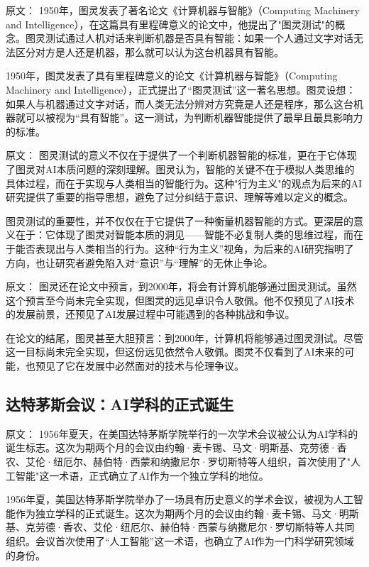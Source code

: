 原文：
1950年，图灵发表了著名论文《计算机器与智能》（Computing Machinery and Intelligence），在这篇具有里程碑意义的论文中，他提出了"图灵测试"的概念。图灵测试通过人机对话来判断机器是否具有智能：如果一个人通过文字对话无法区分对方是人还是机器，那么就可以认为这台机器具有智能。

1950年，图灵发表了具有里程碑意义的论文《计算机器与智能》（Computing Machinery and Intelligence），正式提出了“图灵测试”这一著名思想。图灵设想：如果人与机器通过文字对话，而人类无法分辨对方究竟是人还是程序，那么这台机器就可以被视为“具有智能”。这一测试，为判断机器智能提供了最早且最具影响力的标准。

原文：
图灵测试的意义不仅在于提供了一个判断机器智能的标准，更在于它体现了图灵对AI本质问题的深刻理解。图灵认为，智能的关键不在于模拟人类思维的具体过程，而在于实现与人类相当的智能行为。这种"行为主义"的观点为后来的AI研究提供了重要的指导思想，避免了过分纠结于意识、理解等难以定义的概念。

图灵测试的重要性，并不仅仅在于它提供了一种衡量机器智能的方式。更深层的意义在于：它体现了图灵对智能本质的洞见——智能不必复制人类的思维过程，而在于能否表现出与人类相当的行为。这种“行为主义”视角，为后来的AI研究指明了方向，也让研究者避免陷入对“意识”与“理解”的无休止争论。

原文：
图灵还在论文中预言，到2000年，将会有计算机能够通过图灵测试。虽然这个预言至今尚未完全实现，但图灵的远见卓识令人敬佩。他不仅预见了AI技术的发展前景，还预见了AI发展过程中可能遇到的各种挑战和争议。

在论文的结尾，图灵甚至大胆预言：到2000年，计算机将能够通过图灵测试。尽管这一目标尚未完全实现，但这份远见依然令人敬佩。图灵不仅看到了AI未来的可能，也预见了它在发展中必然面对的技术与伦理争议。

\subsection{达特茅斯会议：AI学科的正式诞生}

原文：
1956年夏天，在美国达特茅斯学院举行的一次学术会议被公认为AI学科的诞生标志。这次为期两个月的会议由约翰·麦卡锡、马文·明斯基、克劳德·香农、艾伦·纽厄尔、赫伯特·西蒙和纳撒尼尔·罗切斯特等人组织，首次使用了"人工智能"这一术语，正式确立了AI作为一个独立学科的地位。

1956年夏，美国达特茅斯学院举办了一场具有历史意义的学术会议，被视为人工智能作为独立学科的正式诞生。这次为期两个月的会议由约翰·麦卡锡、马文·明斯基、克劳德·香农、艾伦·纽厄尔、赫伯特·西蒙与纳撒尼尔·罗切斯特等人共同组织。会议首次使用了“人工智能”这一术语，也确立了AI作为一门科学研究领域的身份。

